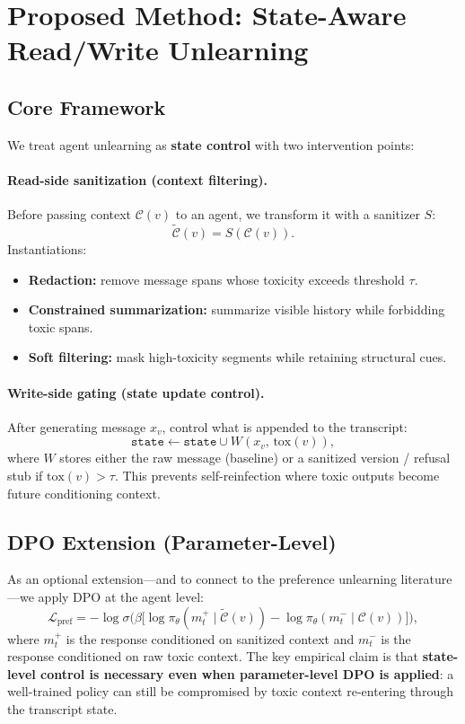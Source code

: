 \documentclass[11pt]{article}
\begin{document}
\section{Proposed Method: State-Aware Read/Write Unlearning}

\subsection{Core Framework}

We treat agent unlearning as \textbf{state control} with two intervention points:

\paragraph{Read-side sanitization (context filtering).}
Before passing context $\mathcal{C}(v)$ to an agent, we transform it with a sanitizer $S$:
\[
\widetilde{\mathcal{C}}(v) = S(\mathcal{C}(v)).
\]
Instantiations:
\begin{itemize}[noitemsep]
  \item \textbf{Redaction:} remove message spans whose toxicity exceeds threshold $\tau$.
  \item \textbf{Constrained summarization:} summarize visible history while forbidding toxic spans.
  \item \textbf{Soft filtering:} mask high-toxicity segments while retaining structural cues.
\end{itemize}

\paragraph{Write-side gating (state update control).}
After generating message $x_v$, control what is appended to the transcript:
\[
\texttt{state} \leftarrow \texttt{state} \cup W(x_v,\, \mathrm{tox}(v)),
\]
where $W$ stores either the raw message (baseline) or a sanitized version / refusal stub
if $\mathrm{tox}(v) > \tau$. This prevents self-reinfection where toxic outputs become
future conditioning context.

\subsection{DPO Extension (Parameter-Level)}

As an optional extension---and to connect to the preference unlearning literature---we
apply DPO at the agent level:
\begin{equation}
\mathcal{L}_{\text{pref}}
= -\log \sigma\!\Big(\beta\big[\log \pi_\theta(m_t^+ \mid \widetilde{\mathcal{C}}(v)) - \log \pi_\theta(m_t^- \mid \mathcal{C}(v))\big]\Big),
\end{equation}
where $m_t^+$ is the response conditioned on sanitized context and $m_t^-$ is the
response conditioned on raw toxic context.
The key empirical claim is that \textbf{state-level control is necessary even when
parameter-level DPO is applied}: a well-trained policy can still be compromised by
toxic context re-entering through the transcript state.
\end{document}
